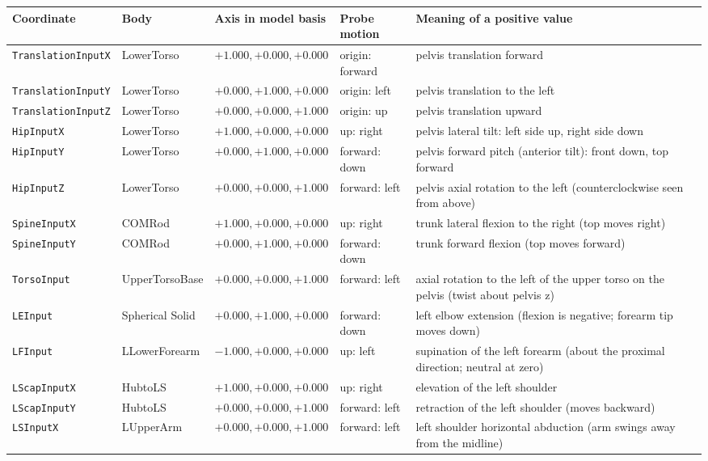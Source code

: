 \documentclass[11pt,a4paper]{article}
\begin{document}
{\footnotesize\setlength{\tabcolsep}{3pt}
\begin{longtable}{@{}l l l l p{50mm}@{}}
\toprule
Coordinate & Body & Axis in model basis & Probe motion & Meaning of a positive value \\
\midrule
\endhead
\texttt{TranslationInputX} & LowerTorso & $+1.000, +0.000, +0.000$ & origin: forward & pelvis translation forward \\
\texttt{TranslationInputY} & LowerTorso & $+0.000, +1.000, +0.000$ & origin: left & pelvis translation to the left \\
\texttt{TranslationInputZ} & LowerTorso & $+0.000, +0.000, +1.000$ & origin: up & pelvis translation upward \\
\texttt{HipInputX} & LowerTorso & $+1.000, +0.000, +0.000$ & up: right & pelvis lateral tilt: left side up, right side down \\
\texttt{HipInputY} & LowerTorso & $+0.000, +1.000, +0.000$ & forward: down & pelvis forward pitch (anterior tilt): front down, top forward \\
\texttt{HipInputZ} & LowerTorso & $+0.000, +0.000, +1.000$ & forward: left & pelvis axial rotation to the left (counterclockwise seen from above) \\
\texttt{SpineInputX} & COMRod & $+1.000, +0.000, +0.000$ & up: right & trunk lateral flexion to the right (top moves right) \\
\texttt{SpineInputY} & COMRod & $+0.000, +1.000, +0.000$ & forward: down & trunk forward flexion (top moves forward) \\
\texttt{TorsoInput} & UpperTorsoBase & $+0.000, +0.000, +1.000$ & forward: left & axial rotation to the left of the upper torso on the pelvis (twist about pelvis z) \\
\texttt{LEInput} & Spherical Solid & $+0.000, +1.000, +0.000$ & forward: down & left elbow extension (flexion is negative; forearm tip moves down) \\
\texttt{LFInput} & LLowerForearm & $-1.000, +0.000, +0.000$ & up: left & supination of the left forearm (about the proximal direction; neutral at zero) \\
\texttt{LScapInputX} & HubtoLS & $+1.000, +0.000, +0.000$ & up: right & elevation of the left shoulder \\
\texttt{LScapInputY} & HubtoLS & $+0.000, +0.000, +1.000$ & forward: left & retraction of the left shoulder (moves backward) \\
\texttt{LSInputX} & LUpperArm & $+0.000, +0.000, +1.000$ & forward: left & left shoulder horizontal abduction (arm swings away from the midline) \\

\end{longtable}}
\end{document}
